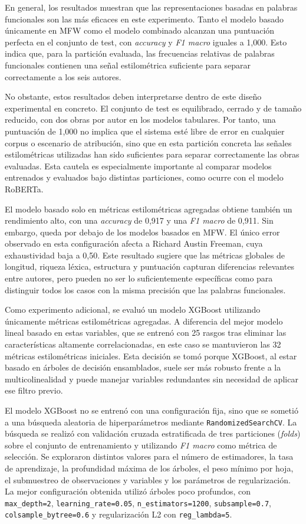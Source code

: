 \documentclass[IB]{TFUOC}%
\begin{document}
En general, los resultados muestran que las representaciones basadas en palabras funcionales son las más eficaces en este experimento. Tanto el modelo basado únicamente en MFW como el modelo combinado alcanzan una puntuación perfecta en el conjunto de test, con \textit{accuracy} y \textit{F1 macro} iguales a 1,000. Esto indica que, para la partición evaluada, las frecuencias relativas de palabras funcionales contienen una señal estilométrica suficiente para separar correctamente a los seis autores.

No obstante, estos resultados deben interpretarse dentro de este diseño experimental en concreto. El conjunto de test es equilibrado, cerrado y de tamaño reducido, con dos obras por autor en los modelos tabulares. Por tanto, una puntuación de 1,000 no implica que el sistema esté libre de error en cualquier corpus o escenario de atribución, sino que en esta partición concreta las señales estilométricas utilizadas han sido suficientes para separar correctamente las obras evaluadas. Esta cautela es especialmente importante al comparar modelos entrenados y evaluados bajo distintas particiones, como ocurre con el modelo RoBERTa.

El modelo basado solo en métricas estilométricas agregadas obtiene también un rendimiento alto, con una \textit{accuracy} de 0,917 y una \textit{F1 macro} de 0,911. Sin embargo, queda por debajo de los modelos basados en MFW. El único error observado en esta configuración afecta a Richard Austin Freeman, cuya exhaustividad baja a 0,50. Este resultado sugiere que las métricas globales de longitud, riqueza léxica, estructura y puntuación capturan diferencias relevantes entre autores, pero pueden no ser lo suficientemente específicas como para distinguir todos los casos con la misma precisión que las palabras funcionales.

Como experimento adicional, se evaluó un modelo XGBoost utilizando únicamente métricas estilométricas agregadas. A diferencia del mejor modelo lineal basado en estas variables, que se entrenó con 25 rasgos tras eliminar las características altamente correlacionadas, en este caso se mantuvieron las 32 métricas estilométricas iniciales. Esta decisión se tomó porque XGBoost, al estar basado en árboles de decisión ensamblados, suele ser más robusto frente a la multicolinealidad y puede manejar variables redundantes sin necesidad de aplicar ese filtro previo.

El modelo XGBoost no se entrenó con una configuración fija, sino que se sometió a una búsqueda aleatoria de hiperparámetros mediante \texttt{RandomizedSearchCV}. La búsqueda se realizó con validación cruzada estratificada de tres particiones (\textit{folds}) sobre el conjunto de entrenamiento y utilizando \textit{F1 macro} como métrica de selección. Se exploraron distintos valores para el número de estimadores, la tasa de aprendizaje, la profundidad máxima de los árboles, el peso mínimo por hoja, el submuestreo de observaciones y variables y los parámetros de regularización. La mejor configuración obtenida utilizó árboles poco profundos, con \texttt{max\_depth=2}, \texttt{learning\_rate=0.05}, \texttt{n\_estimators=1200}, \texttt{subsample=0.7}, \texttt{colsample\_bytree=0.6} y regularización L2 con \texttt{reg\_lambda=5}.
\end{document}

